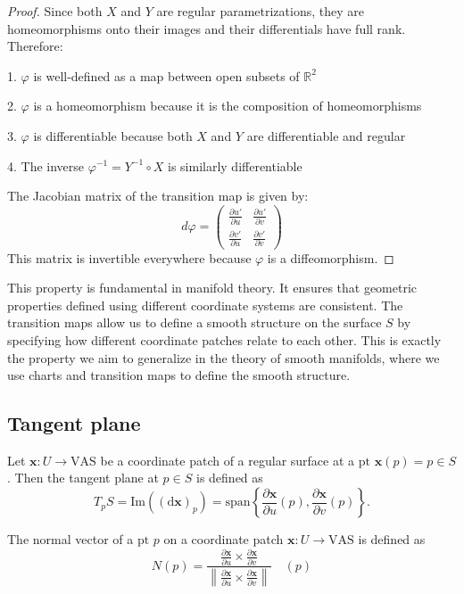 \documentclass{article}
\begin{document}
\begin{proof}
Since both $X$ and $Y$ are regular parametrizations, they are homeomorphisms onto their images and their differentials have full rank. Therefore:

1. $\varphi$ is well-defined as a map between open subsets of $\mathbb{R}^2$

2. $\varphi$ is a homeomorphism because it is the composition of homeomorphisms

3. $\varphi$ is differentiable because both $X$ and $Y$ are differentiable and regular

4. The inverse $\varphi^{-1} = Y^{-1} \circ X$ is similarly differentiable

The Jacobian matrix of the transition map is given by:
\[
d\varphi = \begin{pmatrix}
\frac{\partial u'}{\partial u} & \frac{\partial u'}{\partial v} \\
\frac{\partial v'}{\partial u} & \frac{\partial v'}{\partial v}
\end{pmatrix}
\]
This matrix is invertible everywhere because $\varphi$ is a diffeomorphism.
\end{proof}
\begin{remark}
This property is fundamental in manifold theory. It ensures that geometric properties defined using different coordinate systems are consistent. The transition maps allow us to define a smooth structure on the surface $S$ by specifying how different coordinate patches relate to each other.
This is exactly the property we aim to generalize in the theory of smooth manifolds, where we use charts and transition maps to define the smooth structure.
\end{remark}

\subsection{Tangent plane}
\begin{definition}
Let $\mathbf{x}: U \to \text{VAS}$ be a coordinate patch of a regular surface at a $\text{pt } \mathbf{x}(p) = p \in S$. Then the tangent plane at $p \in S$ is defined as
\[
T_p S = \text{Im} \left( (\mathrm{d}\mathbf{x})_p \right) = \text{span} \left\{ \frac{\partial \mathbf{x}}{\partial u} (p), \frac{\partial \mathbf{x}}{\partial v} (p) \right\}.
\]
\end{definition}

\begin{definition}
The normal vector of a $\text{pt } p$ on a coordinate patch $\mathbf{x}: U \to \text{VAS}$ is defined as
\[
N(p) = \frac{\frac{\partial \mathbf{x}}{\partial u} \times \frac{\partial \mathbf{x}}{\partial v}}{\left\| \frac{\partial \mathbf{x}}{\partial u} \times \frac{\partial \mathbf{x}}{\partial v} \right\|} \quad (p)
\]
\end{definition}
\end{document}
